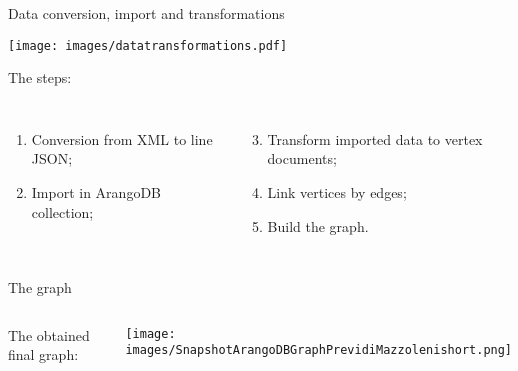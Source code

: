 \documentclass[aspectratio = 169, 15pt]{beamer}
\begin{document}
    \begin{frame}{Data conversion, import and transformations}
        \begin{center}
            \vspace*{-0.1cm}
            \texttt{[image: images/datatransformations.pdf]}
        \end{center}
        
        \vspace*{-0.3cm}
        {\color{darkgray}The steps:}
        \begin{columns}[t]
                \vspace*{-0.3cm}
                \begin{enumerate}
                	\item \small Conversion from XML to line JSON;
                	\item \small Import in ArangoDB collection;
                \end{enumerate}
                
                \vspace*{-1.3cm}
                \begin{enumerate}
                    \setcounter{enumi}{2}
                	\item \small Transform imported data to vertex documents;
                	\item \small Link vertices by edges;
                	\item \small Build the graph.
                \end{enumerate}
        \end{columns}
    \end{frame}
    
    \begin{frame}{The graph}
        
        \begin{columns}[t]
                \small The obtained final graph:
                
                \begin{center}
                    \vspace*{-0.8cm}
                    \hspace*{0.1cm}
                    \texttt{[image: images/SnapshotArangoDBGraphPrevidiMazzolenishort.png]}
                \end{center}
        \end{columns}
    \end{frame}
    
\end{document}
